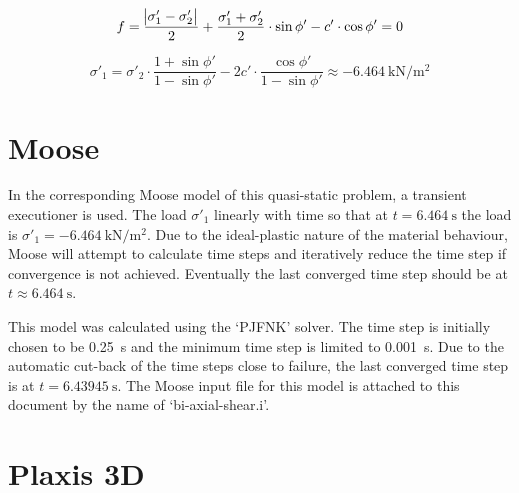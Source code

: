 \begin{equation}
    \label{eqn:Mohr-Coulomb-failure-criterion}
    f = \frac{\abs{\sigma'_1 - \sigma'_2}}{2} + \frac{\sigma'_1 + \sigma'_2}{2} \cdot \sin{\phi'} - c' \cdot \cos{\phi'} = 0
\end{equation}

\begin{equation}
    \label{eqn:bi-axial-test-limit-load}
    \sigma'_1 = \sigma'_2 \cdot \frac{1 + \sin{\phi'}}{1 - \sin{\phi'}} - 2c' \cdot \frac{\cos{\phi'}}{1 - \sin{\phi'}}
    \approx \qty{-6.464}{\kilo\newton\per\square\metre}
\end{equation}

\section{Moose}

In the corresponding Moose model of this quasi-static problem, a transient
executioner is used. The load $\sigma'_1$ linearly with time so that at $t =
    \qty{6.464}{\second}$ the load is $\sigma'_1 =
    \qty{-6.464}{\kilo\newton\per\square\metre}$. Due to the ideal-plastic nature
of the material behaviour, Moose will attempt to calculate time steps and
iteratively reduce the time step if convergence is not achieved. Eventually the
last converged time step should be at $t \approx \qty{6.464}{\second}$.

This model was calculated using the ‘PJFNK’ solver. The time step is initially
chosen to be \qty{0.25}{\second} and the minimum time step is limited to
\qty{0.001}{\second}. Due to the automatic cut-back of the time steps close to
failure, the last converged time step is at $t=\qty{6.43945}{\second}$. The
Moose input file for this model is attached to this document by the name of
‘bi-axial-shear.i’.


\section{Plaxis 3D}
